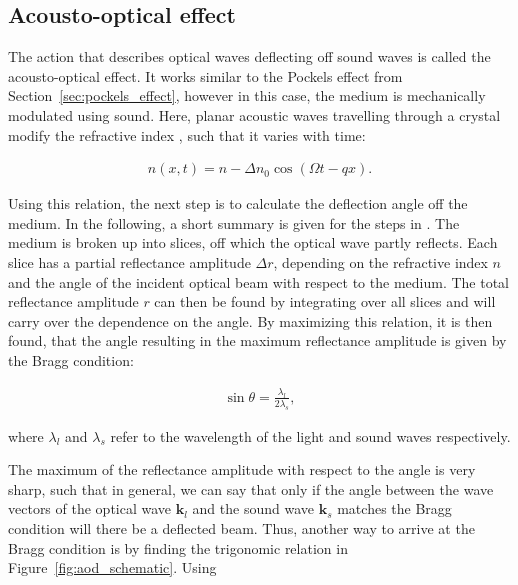 \subsection{Acousto-optical effect}

The action that describes optical waves deflecting off sound waves is called the acousto-optical effect. It works similar to the Pockels effect from Section~\ref{sec:pockels_effect}, however in this case, the medium is mechanically modulated using sound. Here, planar acoustic waves travelling through a crystal modify the refractive index \cite{Saleh1991}, such that it varies with time:

\begin{align}
	n(x, t) = n - \Delta n_0 \cos{\left(\Omega t - q x\right)}.
\end{align}

Using this relation, the next step is to calculate the deflection angle off the medium. In the following, a short summary is given for the steps in \cite{Saleh1991}. The medium is broken up into slices, off which the optical wave partly reflects. Each slice has a partial reflectance amplitude $\Delta r$, depending on the refractive index $n$ and the angle of the incident optical beam with respect to the medium. The total reflectance amplitude $r$ can then be found by integrating over all slices and will carry over the dependence on the angle. By maximizing this relation, it is then found, that the angle resulting in the maximum reflectance amplitude is given by the Bragg condition:


\begin{align}
	\sin \theta = \frac{\lambda_l}{2 \lambda_s},
\end{align}

where $\lambda_l$ and $\lambda_s$ refer to the wavelength of the light and sound waves respectively.

The maximum of the reflectance amplitude with respect to the angle is very sharp, such that in general, we can say that only if the angle between the wave vectors of the optical wave $\mathbf{k}_l$ and the sound wave $\mathbf{k}_s$ matches the Bragg condition will there be a deflected beam. Thus, another way to arrive at the Bragg condition is by finding the trigonomic relation in Figure~\ref{fig:aod_schematic}. Using

